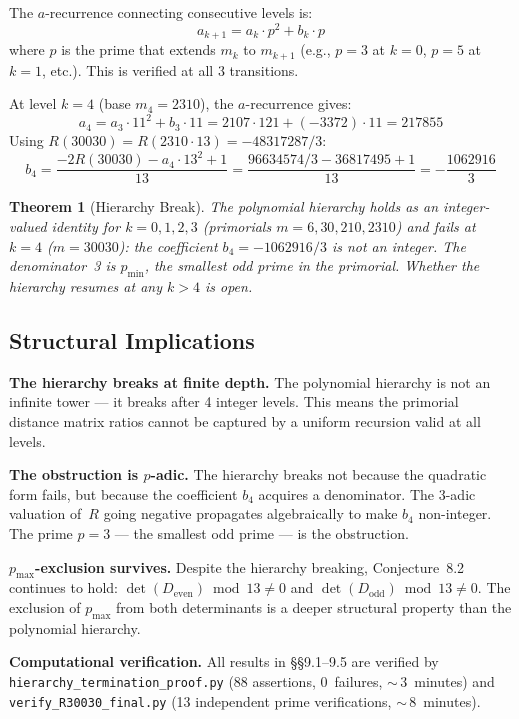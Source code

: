 \documentclass[11pt,letterpaper]{article}
\newtheorem{theorem}{Theorem}[section]
\theoremstyle{definition}
\begin{document}
The $a$-recurrence connecting consecutive levels is:
\[
a_{k+1} = a_k \cdot p^2 + b_k \cdot p
\]
where $p$ is the prime that extends $m_k$ to $m_{k+1}$ (e.g., $p = 3$ at $k = 0$, $p = 5$ at $k = 1$, etc.). This is verified at all 3 transitions.

At level $k = 4$ (base $m_4 = 2310$), the $a$-recurrence gives:
\[
a_4 = a_3 \cdot 11^2 + b_3 \cdot 11 = 2107 \cdot 121 + (-3372) \cdot 11 = 217855
\]
Using $R(30030) = R(2310 \cdot 13) = -48317287/3$:
\[
b_4 = \frac{-2R(30030) - a_4 \cdot 13^2 + 1}{13}
    = \frac{96634574/3 - 36817495 + 1}{13}
    = -\frac{1062916}{3}
\]

\begin{theorem}[Hierarchy Break]
The polynomial hierarchy holds as an integer-valued identity for $k = 0, 1, 2, 3$ (primorials $m = 6, 30, 210, 2310$) and fails at $k = 4$ ($m = 30030$): the coefficient $b_4 = -1062916/3$ is not an integer. The denominator~3 is $p_{\text{min}}$, the smallest odd prime in the primorial. Whether the hierarchy resumes at any $k > 4$ is open.
\end{theorem}

\subsection{Structural Implications}

\textbf{The hierarchy breaks at finite depth.} The polynomial hierarchy is not an infinite tower --- it breaks after 4 integer levels. This means the primorial distance matrix ratios cannot be captured by a uniform recursion valid at all levels.

\textbf{The obstruction is $p$-adic.} The hierarchy breaks not because the quadratic form fails, but because the coefficient $b_4$ acquires a denominator. The 3-adic valuation of~$R$ going negative propagates algebraically to make $b_4$ non-integer. The prime $p = 3$ --- the smallest odd prime --- is the obstruction.

\textbf{$p_{\text{max}}$-exclusion survives.} Despite the hierarchy breaking, Conjecture~8.2 continues to hold: $\det(D_{\text{even}}) \bmod 13 \neq 0$ and $\det(D_{\text{odd}}) \bmod 13 \neq 0$. The exclusion of $p_{\text{max}}$ from both determinants is a deeper structural property than the polynomial hierarchy.

\textbf{Computational verification.} All results in \S\S9.1--9.5 are verified by \texttt{hierarchy\_\allowbreak termination\_\allowbreak proof.py} (88 assertions, 0~failures, ${\sim}\,3$~minutes) and \texttt{verify\_\allowbreak R30030\_\allowbreak final.py} (13 independent prime verifications, ${\sim}\,8$~minutes).
\end{document}
